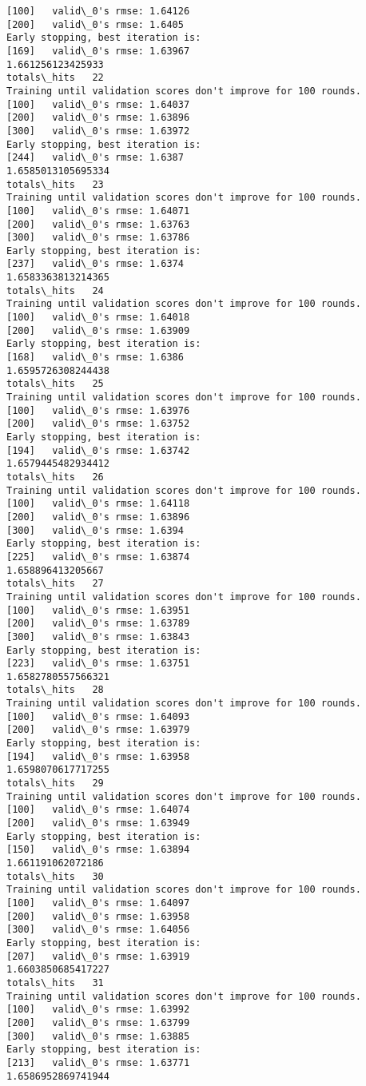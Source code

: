 \documentclass[11pt]{article}
\begin{document}
\begin{Verbatim}[commandchars=\\\{\}]
[100]	valid\_0's rmse: 1.64126
[200]	valid\_0's rmse: 1.6405
Early stopping, best iteration is:
[169]	valid\_0's rmse: 1.63967
1.661256123425933
totals\_hits   22
Training until validation scores don't improve for 100 rounds.
[100]	valid\_0's rmse: 1.64037
[200]	valid\_0's rmse: 1.63896
[300]	valid\_0's rmse: 1.63972
Early stopping, best iteration is:
[244]	valid\_0's rmse: 1.6387
1.6585013105695334
totals\_hits   23
Training until validation scores don't improve for 100 rounds.
[100]	valid\_0's rmse: 1.64071
[200]	valid\_0's rmse: 1.63763
[300]	valid\_0's rmse: 1.63786
Early stopping, best iteration is:
[237]	valid\_0's rmse: 1.6374
1.6583363813214365
totals\_hits   24
Training until validation scores don't improve for 100 rounds.
[100]	valid\_0's rmse: 1.64018
[200]	valid\_0's rmse: 1.63909
Early stopping, best iteration is:
[168]	valid\_0's rmse: 1.6386
1.6595726308244438
totals\_hits   25
Training until validation scores don't improve for 100 rounds.
[100]	valid\_0's rmse: 1.63976
[200]	valid\_0's rmse: 1.63752
Early stopping, best iteration is:
[194]	valid\_0's rmse: 1.63742
1.6579445482934412
totals\_hits   26
Training until validation scores don't improve for 100 rounds.
[100]	valid\_0's rmse: 1.64118
[200]	valid\_0's rmse: 1.63896
[300]	valid\_0's rmse: 1.6394
Early stopping, best iteration is:
[225]	valid\_0's rmse: 1.63874
1.658896413205667
totals\_hits   27
Training until validation scores don't improve for 100 rounds.
[100]	valid\_0's rmse: 1.63951
[200]	valid\_0's rmse: 1.63789
[300]	valid\_0's rmse: 1.63843
Early stopping, best iteration is:
[223]	valid\_0's rmse: 1.63751
1.6582780557566321
totals\_hits   28
Training until validation scores don't improve for 100 rounds.
[100]	valid\_0's rmse: 1.64093
[200]	valid\_0's rmse: 1.63979
Early stopping, best iteration is:
[194]	valid\_0's rmse: 1.63958
1.6598070617717255
totals\_hits   29
Training until validation scores don't improve for 100 rounds.
[100]	valid\_0's rmse: 1.64074
[200]	valid\_0's rmse: 1.63949
Early stopping, best iteration is:
[150]	valid\_0's rmse: 1.63894
1.661191062072186
totals\_hits   30
Training until validation scores don't improve for 100 rounds.
[100]	valid\_0's rmse: 1.64097
[200]	valid\_0's rmse: 1.63958
[300]	valid\_0's rmse: 1.64056
Early stopping, best iteration is:
[207]	valid\_0's rmse: 1.63919
1.6603850685417227
totals\_hits   31
Training until validation scores don't improve for 100 rounds.
[100]	valid\_0's rmse: 1.63992
[200]	valid\_0's rmse: 1.63799
[300]	valid\_0's rmse: 1.63885
Early stopping, best iteration is:
[213]	valid\_0's rmse: 1.63771
1.6586952869741944

\end{Verbatim}
\end{document}
